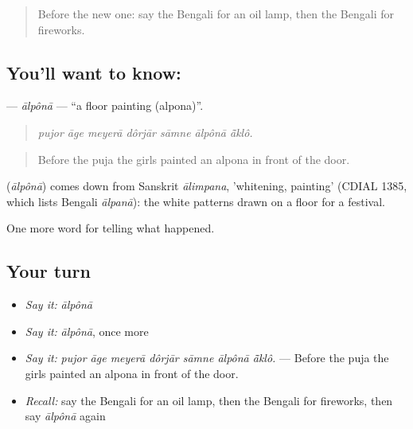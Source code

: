 \begin{quote}
Before the new one: say the Bengali for an oil lamp, then the Bengali for fireworks.
\end{quote}

\subsection*{You'll want to know: }
\textbf{} — \emph{ālpônā} — \textquotedblleft{}a floor painting (alpona)\textquotedblright{}.

\begin{quote}
      
\end{quote}

\begin{quote}
\emph{pujor āge meyerā dôrjār sāmne ālpônā ā̃klô.}
\end{quote}

\begin{quote}
Before the puja the girls painted an alpona in front of the door.
\end{quote}

\begin{cousinweb}
\textbf{} (\emph{ālpônā}) comes down from Sanskrit \emph{ālimpana}, 'whitening, painting' (CDIAL 1385, which lists Bengali \emph{ālpanā}): the white patterns drawn on a floor for a festival.
\end{cousinweb}

\begin{grammarlens}[title={What you've built}]
One more word for telling what happened.
\end{grammarlens}

\subsection*{Your turn}
\begin{itemize}
\raggedright
  \item \emph{Say it:} \emph{ālpônā}
  \item \emph{Say it:} \emph{ālpônā}, once more
  \item \emph{Say it:} \emph{pujor āge meyerā dôrjār sāmne ālpônā ā̃klô.} — Before the puja the girls painted an alpona in front of the door.
  \item \emph{Recall:} say the Bengali for an oil lamp, then the Bengali for fireworks, then say \emph{ālpônā} again
\end{itemize}

